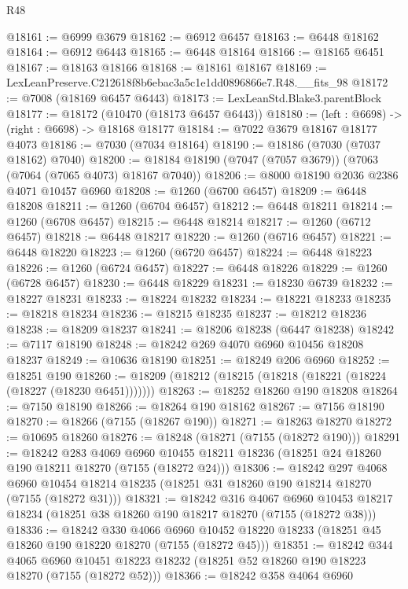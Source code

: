 \begin{lexlean}{R48}
\begin{coremodule}
@18161 := @6999 @3679
@18162 := @6912 @6457
@18163 := @6448 @18162
@18164 := @6912 @6443
@18165 := @6448 @18164
@18166 := @18165 @6451
@18167 := @18163 @18166
@18168 := @18161 @18167
@18169 := LexLeanPreserve.C212618f8b6ebac3a5c1e1dd0896866e7.R48.__fits_98
@18172 := @7008 (@18169 @6457 @6443)
@18173 := LexLeanStd.Blake3.parentBlock
@18177 := @18172 (@10470 (@18173 @6457 @6443))
@18180 := (left : @6698) -> (right : @6698) -> @18168 @18177
@18184 := @7022 @3679 @18167 @18177 @4073
@18186 := @7030 (@7034 @18164)
@18190 := @18186 (@7030 (@7037 @18162) @7040)
@18200 := @18184 @18190 (@7047 (@7057 @3679)) (@7063 (@7064 (@7065 @4073) @18167 @7040))
@18206 := @8000 @18190 @2036 @2386 @4071 @10457 @6960
@18208 := @1260 (@6700 @6457)
@18209 := @6448 @18208
@18211 := @1260 (@6704 @6457)
@18212 := @6448 @18211
@18214 := @1260 (@6708 @6457)
@18215 := @6448 @18214
@18217 := @1260 (@6712 @6457)
@18218 := @6448 @18217
@18220 := @1260 (@6716 @6457)
@18221 := @6448 @18220
@18223 := @1260 (@6720 @6457)
@18224 := @6448 @18223
@18226 := @1260 (@6724 @6457)
@18227 := @6448 @18226
@18229 := @1260 (@6728 @6457)
@18230 := @6448 @18229
@18231 := @18230 @6739
@18232 := @18227 @18231
@18233 := @18224 @18232
@18234 := @18221 @18233
@18235 := @18218 @18234
@18236 := @18215 @18235
@18237 := @18212 @18236
@18238 := @18209 @18237
@18241 := @18206 @18238 (@6447 @18238)
@18242 := @7117 @18190
@18248 := @18242 @269 @4070 @6960 @10456 @18208 @18237
@18249 := @10636 @18190
@18251 := @18249 @206 @6960
@18252 := @18251 @190
@18260 := @18209 (@18212 (@18215 (@18218 (@18221 (@18224 (@18227 (@18230 @6451)))))))
@18263 := @18252 @18260 @190 @18208
@18264 := @7150 @18190
@18266 := @18264 @190 @18162
@18267 := @7156 @18190
@18270 := @18266 (@7155 (@18267 @190))
@18271 := @18263 @18270
@18272 := @10695 @18260
@18276 := @18248 (@18271 (@7155 (@18272 @190)))
@18291 := @18242
    @283
    @4069
    @6960
    @10455
    @18211
    @18236
    (@18251 @24 @18260 @190 @18211 @18270 (@7155 (@18272 @24)))
@18306 := @18242
    @297
    @4068
    @6960
    @10454
    @18214
    @18235
    (@18251 @31 @18260 @190 @18214 @18270 (@7155 (@18272 @31)))
@18321 := @18242
    @316
    @4067
    @6960
    @10453
    @18217
    @18234
    (@18251 @38 @18260 @190 @18217 @18270 (@7155 (@18272 @38)))
@18336 := @18242
    @330
    @4066
    @6960
    @10452
    @18220
    @18233
    (@18251 @45 @18260 @190 @18220 @18270 (@7155 (@18272 @45)))
@18351 := @18242
    @344
    @4065
    @6960
    @10451
    @18223
    @18232
    (@18251 @52 @18260 @190 @18223 @18270 (@7155 (@18272 @52)))
@18366 := @18242
    @358
    @4064
    @6960

\end{coremodule}
\end{lexlean}
